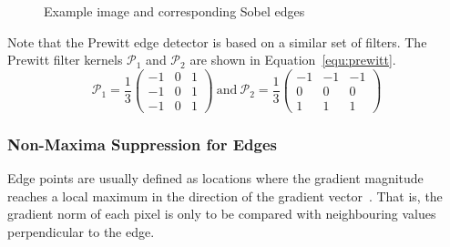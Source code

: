 \documentclass[12pt,a4paper,oneside,openright]{book}
\newcommand{\Ie}{That is, }
\newcommand{\equ}[1]{Equation~\ref{equ:#1}}
\begin{document}
\begin{CJK}{UTF8}{}
\begin{figure}[htbp]
\begin{center}
\begin{minipage}[t]{.45\textwidth}
     \end{minipage}
     \caption{Example image and corresponding Sobel edges\label{fig:sobel}}
   \end{center}
\end{figure}

Note that the Prewitt edge detector is based on a similar set of filters. The Prewitt filter kernels $\mathcal{P}_1$ and $\mathcal{P}_2$ are shown in \equ{prewitt}.
\begin{equation}\label{equ:prewitt}
  \mathcal{P}_1=\displaystyle\frac{1}{3}
  \begin{pmatrix} -1 &  0 &  1 \\ -1 &  0 &  1 \\ -1 &  0 &  1 \end{pmatrix}
  \mathrm{\ and\ }
  \mathcal{P}_2=\displaystyle\frac{1}{3}
  \begin{pmatrix} -1 & -1 & -1 \\  0 &  0 &  0 \\  1 &  1 &  1 \end{pmatrix}
\end{equation}

\subsubsection{Non-Maxima Suppression for Edges}
Edge points are usually defined as locations where the gradient magnitude reaches a local maximum in the direction of the gradient vector~\citep{canny1986computational}. \Ie the gradient norm of each pixel is only to be compared with neighbouring values perpendicular to the edge.


\end{CJK}
\end{document}
